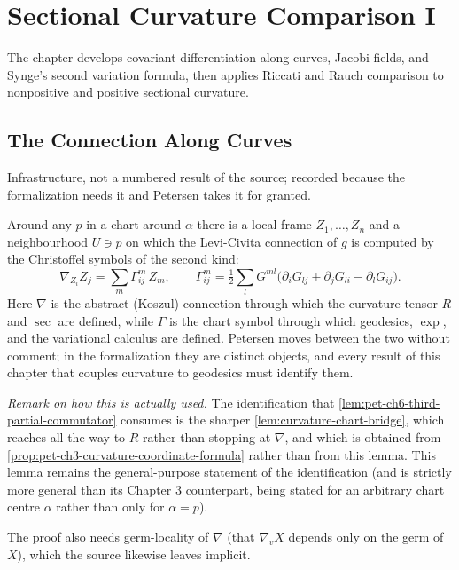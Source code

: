 \chapter{Sectional Curvature Comparison I}
\label{chap:pet-sectional-curvature-comparison-i}

The chapter develops covariant differentiation along curves, Jacobi fields, and
Synge's second variation formula, then applies Riccati and Rauch comparison to
nonpositive and positive sectional curvature.

\section{The Connection Along Curves}

\begin{lemma}
  \label{lem:chart-connection-bridge}
  \leanok
  Infrastructure, not a numbered result of the source; recorded because the
  formalization needs it and Petersen takes it for granted.

  Around any $p$ in a chart around $\alpha$ there is a local frame $Z_1,\dots,Z_n$
  and a neighbourhood $U\ni p$ on which the Levi-Civita connection of $g$ is
  computed by the Christoffel symbols of the second kind:
  \[
    \nabla_{Z_i}Z_j=\sum_m\Gamma^m_{ij}\,Z_m,\qquad
    \Gamma^m_{ij}=\tfrac12\sum_lG^{ml}\big(\partial_iG_{lj}+\partial_jG_{li}
      -\partial_lG_{ij}\big).
  \]
  Here $\nabla$ is the abstract (Koszul) connection through which the curvature
  tensor $R$ and $\sec$ are defined, while $\Gamma$ is the chart symbol through
  which geodesics, $\exp$, and the variational calculus are defined. Petersen
  moves between the two without comment; in the formalization they are distinct
  objects, and every result of this chapter that couples curvature to geodesics
  must identify them.

  \emph{Remark on how this is actually used.} The identification that
  \cref{lem:pet-ch6-third-partial-commutator} consumes is the sharper
  \cref{lem:curvature-chart-bridge}, which reaches all the way to $R$ rather than
  stopping at $\nabla$, and which is obtained from
  \cref{prop:pet-ch3-curvature-coordinate-formula} rather than from this lemma.
  This lemma remains the general-purpose statement of the identification (and is
  strictly more general than its Chapter 3 counterpart, being stated for an
  arbitrary chart centre $\alpha$ rather than only for $\alpha=p$).

  The proof also needs germ-locality of $\nabla$ (that $\nabla_vX$ depends only on
  the germ of $X$), which the source likewise leaves implicit.
\end{lemma}

